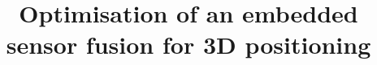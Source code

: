 \documentclass{vldb}
\begin{document}

\title{Optimisation of an embedded sensor fusion for 3D positioning}



%
%
%
%

\end{document}
